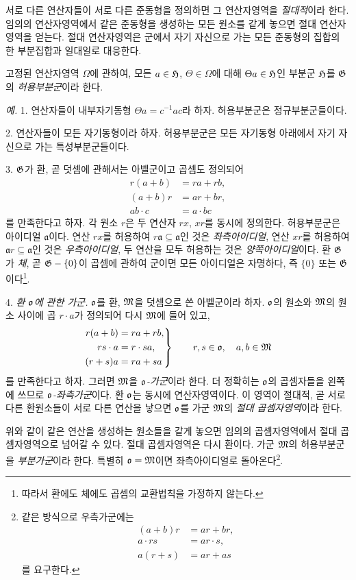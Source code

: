 서로 다른 연산자들이 서로 다른 준동형을 정의하면 그 연산자영역을 \emph{절대적}이라 한다. 임의의 연산자영역에서 같은 준동형을 생성하는 모든 원소를 같게 놓으면 절대 연산자영역을 얻는다. 절대 연산자영역은 군에서 자기 자신으로 가는 모든 준동형의 집합의 한 부분집합과 일대일로 대응한다.

고정된 연산자영역 \(\Omega\)에 관하여, 모든 \(a\in\mathfrak H\), \(\Theta\in\Omega\)에 대해 \(\Theta a\in\mathfrak H\)인 부분군 \(\mathfrak H\)를 \(\mathfrak G\)의 \emph{허용부분군}이라 한다.

\emph{예.} 1. 연산자들이 내부자기동형 \(\Theta a=c^{-1}ac\)라 하자. 허용부분군은 정규부분군들이다.

2. 연산자들이 모든 자기동형이라 하자. 허용부분군은 모든 자기동형 아래에서 자기 자신으로 가는 \glqq{}특성부분군\grqq{}들이다.

3. \(\mathfrak G\)가 환, 곧 덧셈에 관해서는 아벨군이고 곱셈도 정의되어
\[
\begin{aligned}
r(a+b)&=ra+rb,\\
(a+b)r&=ar+br,\\
ab\cdot c&=a\cdot bc
\end{aligned}
\]
를 만족한다고 하자. 각 원소 \(r\)은 두 연산자 \(rx\), \(xr\)를 동시에 정의한다. 허용부분군은 \glqq{}아이디얼\grqq{} \(\mathfrak a\)이다. 연산 \(rx\)를 허용하여 \(r\mathfrak a\subseteq\mathfrak a\)인 것은 \emph{좌측아이디얼}, 연산 \(xr\)를 허용하여 \(\mathfrak a r\subseteq\mathfrak a\)인 것은 \emph{우측아이디얼}, 두 연산을 모두 허용하는 것은 \emph{양쪽아이디얼}이다. 환 \(\mathfrak G\)가 \emph{체}, 곧 \(\mathfrak G-\{0\}\)이 곱셈에 관하여 군이면 모든 아이디얼은 자명하다, 즉 \(\{0\}\) 또는 \(\mathfrak G\)이다\footnote{따라서 환에도 체에도 곱셈의 교환법칙을 가정하지 않는다.}.

4. \emph{환 \(\mathfrak o\)에 관한 가군.} \(\mathfrak o\)를 환, \(\mathfrak M\)을 덧셈으로 쓴 아벨군이라 하자. \(\mathfrak o\)의 원소와 \(\mathfrak M\)의 원소 사이에 곱 \(r\cdot a\)가 정의되어 다시 \(\mathfrak M\)에 들어 있고,
\[
\left.
\begin{aligned}
 r(a+b)&=ra+rb,\\
 rs\cdot a&=r\cdot sa,\\
 (r+s)a&=ra+sa
\end{aligned}
\right\}\qquad r,s\in\mathfrak o,\quad a,b\in\mathfrak M
\]
를 만족한다고 하자. 그러면 \(\mathfrak M\)을 \emph{\(\mathfrak o\)-가군}이라 한다. 더 정확히는 \(\mathfrak o\)의 곱셈자들을 왼쪽에 쓰므로 \emph{\(\mathfrak o\)-좌측가군}이다. 환 \(\mathfrak o\)는 동시에 연산자영역이다. 이 영역이 절대적, 곧 서로 다른 환원소들이 서로 다른 연산을 낳으면 \(\mathfrak o\)를 가군 \(\mathfrak M\)의 \emph{절대 곱셈자영역}이라 한다.

위와 같이 같은 연산을 생성하는 원소들을 같게 놓으면 임의의 곱셈자영역에서 절대 곱셈자영역으로 넘어갈 수 있다. 절대 곱셈자영역은 다시 환이다. 가군 \(\mathfrak M\)의 허용부분군을 \emph{부분가군}이라 한다. 특별히 \(\mathfrak o=\mathfrak M\)이면 좌측아이디얼로 돌아온다\footnote{같은 방식으로 우측가군에는
\[
\begin{aligned}
(a+b)r&=ar+br,\\
a\cdot rs&=ar\cdot s,\\
a(r+s)&=ar+as
\end{aligned}
\]
를 요구한다.}.

